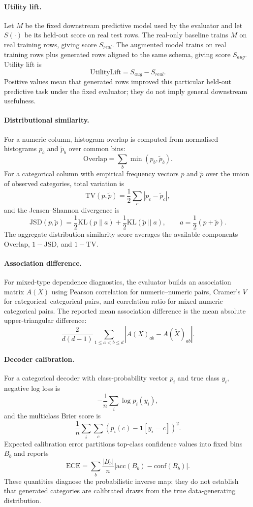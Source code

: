 \paragraph{Utility lift.}
Let $M$ be the fixed downstream predictive model used by the evaluator and let
$S(\cdot)$ be its held-out score on real test rows. The real-only baseline
trains $M$ on real training rows, giving score $S_{real}$. The augmented model
trains on real training rows plus generated rows aligned to the same schema,
giving score $S_{aug}$. Utility lift is
\[
  \mathrm{UtilityLift}=S_{aug}-S_{real}.
\]
Positive values mean that generated rows improved this particular held-out
predictive task under the fixed evaluator; they do not imply general
downstream usefulness.

\paragraph{Distributional similarity.}
For a numeric column, histogram overlap is computed from normalised histograms
$p_b$ and $\widetilde{p}_b$ over common bins:
\[
  \mathrm{Overlap}=\sum_b \min(p_b,\widetilde{p}_b).
\]
For a categorical column with empirical frequency vectors $p$ and
$\widetilde{p}$ over the union of observed categories, total variation is
\[
  \mathrm{TV}(p,\widetilde{p})
  =
  \frac{1}{2}\sum_c |p_c-\widetilde{p}_c|,
\]
and the Jensen--Shannon divergence is
\[
  \mathrm{JSD}(p,\widetilde{p})
  =
  \frac{1}{2}\mathrm{KL}(p\|a)
  +
  \frac{1}{2}\mathrm{KL}(\widetilde{p}\|a),
  \qquad
  a=\frac{1}{2}(p+\widetilde{p}).
\]
The aggregate distribution similarity score averages the available components
$\mathrm{Overlap}$, $1-\mathrm{JSD}$, and $1-\mathrm{TV}$.

\paragraph{Association difference.}
For mixed-type dependence diagnostics, the evaluator builds an association
matrix $A(X)$ using Pearson correlation for numeric--numeric pairs, Cramer's
$V$ for categorical--categorical pairs, and correlation ratio for mixed
numeric--categorical pairs. The reported mean association difference is the
mean absolute upper-triangular difference:
\[
  \frac{2}{d(d-1)}
  \sum_{1\le a<b\le d}
  |A(X)_{ab}-A(\widetilde{X})_{ab}|.
\]

\paragraph{Decoder calibration.}
For a categorical decoder with class-probability vector $p_i$ and true class
$y_i$, negative log loss is
\[
  -\frac{1}{n}\sum_i \log p_i(y_i),
\]
and the multiclass Brier score is
\[
  \frac{1}{n}\sum_i \sum_c \left(p_i(c)-\mathbf{1}[y_i=c]\right)^2.
\]
Expected calibration error partitions top-class confidence values into fixed
bins $B_b$ and reports
\[
  \mathrm{ECE}
  =
  \sum_b \frac{|B_b|}{n}
  \left|
    \mathrm{acc}(B_b)-\mathrm{conf}(B_b)
  \right|.
\]
These quantities diagnose the probabilistic inverse map; they do not establish
that generated categories are calibrated draws from the true data-generating
distribution.

